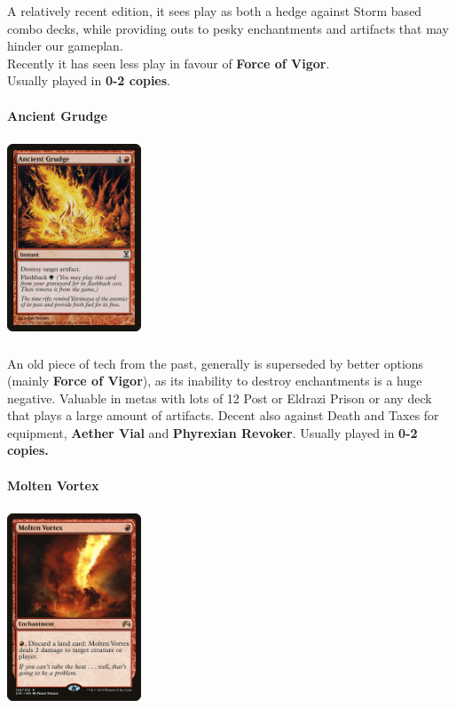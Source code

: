 \documentclass{report}
\begin{document}
A relatively recent edition, it sees play as both a hedge against Storm based combo decks, while providing outs to pesky enchantments and artifacts that may hinder our gameplan. \\Recently it has seen less play in favour of \textbf{Force of Vigor}. \\Usually played in \textbf{0-2 copies}.\\\\
\textbf{Ancient Grudge\\}
\begin{center}
\includegraphics [width = 4cm, height = 6cm] {ancient-grudge}
\end{center}
An old piece of tech from the past, generally is superseded by better options (mainly \textbf{Force of Vigor}), as its inability to destroy enchantments is a huge negative. Valuable in metas with lots of 12 Post or Eldrazi Prison or any deck that plays a large amount of artifacts. Decent also against Death and Taxes for equipment, \textbf{Aether Vial} and \textbf{Phyrexian Revoker}. Usually played in \textbf{0-2 copies.}\\\\
\textbf{Molten Vortex}
\begin{center}
\includegraphics [width = 4cm, height = 6cm] {molten-vortex}
\end{center}
\end{document}
